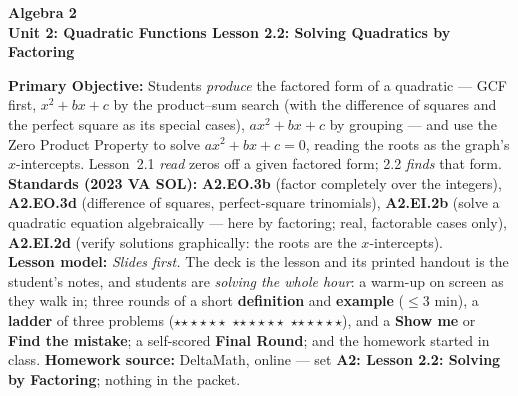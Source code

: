 \documentclass[10pt]{article}
\newcommand{\CourseName}{Algebra 2}
\newcommand{\UnitNumberName}{Unit 2: Quadratic Functions \quad}
\newcommand{\LessonNumberName}{Lesson 2.2: Solving Quadratics by Factoring}
\newcommand{\rung}[1]{{\color{goldacc}\ifcase#1\or$\star$\or$\star\star$\or$\star\star\star$\fi}}
\begin{document}
\begin{center}
    {\Large\bfseries \CourseName \\
    {\small\bfseries \UnitNumberName \LessonNumberName}}
\end{center}

\begin{tcolorbox}[colback=forestbg, colframe=forest, boxrule=0.9pt, arc=2mm,
    left=2mm, right=2mm, top=1.5mm, bottom=1.5mm]
    \textbf{Primary Objective:} Students \emph{produce} the factored form of a quadratic --- GCF
    first, $x^2+bx+c$ by the product--sum search (with the difference of squares and the perfect
    square as its special cases), $ax^2+bx+c$ by grouping --- and use the Zero Product Property
    to solve $ax^2+bx+c=0$, reading the roots as the graph's $x$-intercepts. Lesson~2.1
    \emph{read} zeros off a given factored form; 2.2 \emph{finds} that form.
    \\[2pt]
    \textbf{Standards (2023 VA SOL):} \textbf{A2.EO.3b} (factor completely over the integers),
    \textbf{A2.EO.3d} (difference of squares, perfect-square trinomials), \textbf{A2.EI.2b}
    (solve a quadratic equation algebraically --- here by factoring; real, factorable cases
    only), \textbf{A2.EI.2d} (verify solutions graphically: the roots are the $x$-intercepts).
    \\[2pt]
    \textbf{Lesson model:} \emph{Slides first.} The deck is the lesson and its printed handout is
    the student's notes, and students are \emph{solving the whole hour}: a warm-up on screen as
    they walk in; three rounds of a short \textbf{definition} and \textbf{example} ($\le$3 min),
    a \textbf{ladder} of three problems (\rung1\ \rung2\ \rung3), and a \textbf{Show me} or
    \textbf{Find the mistake}; a self-scored \textbf{Final Round}; and the homework started in
    class. \textbf{Homework source:} DeltaMath, online --- set \textbf{A2: Lesson 2.2: Solving by Factoring};
    nothing in the packet.
\end{tcolorbox}
\end{document}
